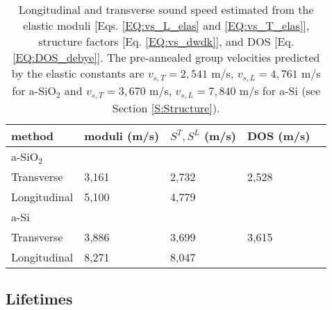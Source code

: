 \documentclass[aps,prb,onecolumn,preprint,superscriptaddress,footinbib,amsmath,amssymb,floatfix]{revtex4}
\begin{document}
\begin{center}
\begingroup
\begin{table}
\caption{\label{T:vs}
Longitudinal and transverse sound speed estimated from the elastic 
moduli [Eqs. \eqref{EQ:vs_L_elas} and \eqref{EQ:vs_T_elas}], 
structure factors [Eq. \eqref{EQ:vs_dwdk}], and 
DOS [Eq. \eqref{EQ:DOS_debye}]. The pre-annealed group velocities 
predicted by the elastic constants are 
$v_{s,T} = 2,541$ m/s, $v_{s,L} = 4,761 $ m/s for a-SiO$_2$ and 
$v_{s,T} = 3,670$ m/s, $v_{s,L} = 7,840$ m/s for a-Si 
(see Section \ref{S:Structure}).
}
\begin{tabular}{lllll}
\hline \hline
method & moduli (m/s) & $S^{T}, S^{L}$ (m/s)
& DOS (m/s) & \\
\hline
a-SiO$_2$  \\
\hline
Transverse & 3,161 & 2,732 & 2,528 &  \\
Longitudinal & 5,100 &  4,779 & & \\
\hline
a-Si  \\
\hline
Transverse & 3,886 & 3,699 & 3,615 & \\
Longitudinal & 8,271 & 8,047 & &    \\
\hline \hline
\end{tabular}
\end{table}
\endgroup
\end{center}
\vspace{10mm}

\subsection{\label{S:Life}Lifetimes}
\end{document}
